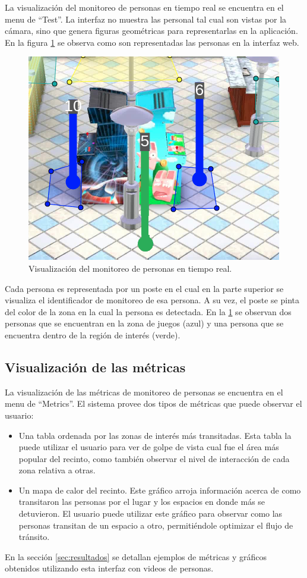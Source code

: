 La visualización del monitoreo de personas en tiempo real se encuentra en el menu de ``Test''. La interfaz no muestra las personal tal cual son vistas por la cámara, sino que genera figuras geométricas para representarlas en la aplicación. En la figura \ref{fig:visualizacionSeguimiento} se observa como son representadas las personas en la interfaz web.

\begin{figure}[ht]
	\centering
	\includegraphics[scale=.8]{./Figures/visualizacionSeguimiento.png}
	\caption{Visualización del monitoreo de personas en tiempo real.}
	\label{fig:visualizacionSeguimiento}
\end{figure}

Cada persona es representada por un poste en el cual en la parte superior se visualiza el identificador de monitoreo de esa persona. A su vez, el poste se pinta del color de la zona en la cual la persona es detectada. En la \ref{fig:visualizacionSeguimiento} se observan dos personas que se encuentran en la zona de juegos (azul) y una persona que se encuentra dentro de la región de interés (verde).

\subsection{Visualización de las métricas}

La visualización de las métricas de monitoreo de personas se encuentra en el menu de ``Metrics''. El sistema provee dos tipos de métricas que puede observar el usuario:

\begin{itemize}
\item Una tabla ordenada por las zonas de interés más transitadas. Esta tabla la puede utilizar el usuario para ver de golpe de vista cual fue el área más popular del recinto, como también observar el nivel de interacción de cada zona relativa a otras.
\item Un mapa de calor del recinto. Este gráfico arroja información acerca de como transitaron las personas por el lugar y los espacios en donde más se detuvieron. El usuario puede utilizar este gráfico para observar como las personas transitan de un espacio a otro, permitiéndole optimizar el flujo de tránsito.
\end{itemize}

En la sección \ref{sec:resultados} se detallan ejemplos de métricas y gráficos obtenidos utilizando esta interfaz con videos de personas.
